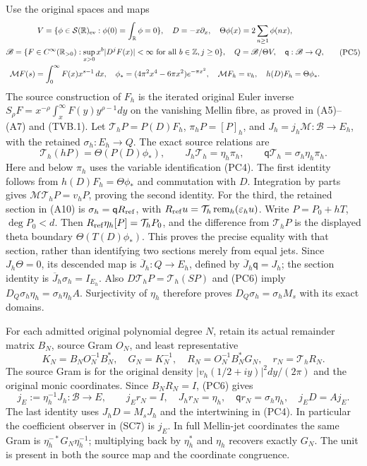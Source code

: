 Use the original spaces and maps
\[
\begin{gathered}
 V=\{\phi\in\mathcal S(\mathbb R)_{\rm ev}:
             \phi(0)=\int_{\mathbb R}\phi=0\},\quad
 D=-x\partial_x,\quad\Theta\phi(x)=2\sum_{n\ge1}\phi(nx),\\
 \mathscr B=\{F\in C^\infty(\mathbb R_{>0}):\sup_{x>0}x^b|D^jF(x)|<\infty
                  \text{ for all }b\in\mathbb Z,j\ge0\},\quad
 Q=\mathscr B/\Theta V,\quad\mathsf q:\mathscr B\to Q,\\
 \mathcal MF(s)=\int_0^\infty F(x)x^{s-1}\,dx,\quad
 \phi_*=(4\pi^2x^4-6\pi x^2)e^{-\pi x^2},\quad
 \mathcal M F_h=v_h,\quad h(D)F_h=\Theta\phi_*.
\end{gathered}\tag{PC5}
\]
The source construction of $F_h$ is the iterated original Euler inverse
$S_\rho F=x^{-\rho}\int_x^\infty F(y)y^{\rho-1}dy$ on the
vanishing Mellin fibre, as proved in (A5)--(A7) and (TVB.1).
Let $\mathcal T_hP=P(D)F_h$, $\pi_hP=[P]_h$, and
$J_h=j_h\mathcal M:\mathscr B\to E_h$, with the retained
$\sigma_h:E_h\to Q$.  The exact source relations are
\[
 \mathcal T_h(hP)=\Theta(P(D)\phi_*),\qquad
 J_h\mathcal T_h=\eta_h\pi_h,\qquad
 \mathsf q\mathcal T_h=\sigma_h\eta_h\pi_h.
 \tag{PC6}
\]
Here and below $\pi_h$ uses the variable identification (PC4).
The first identity follows from $h(D)F_h=\Theta\phi_*$ and
commutation with $D$.  Integration by parts gives
$\mathcal M\mathcal T_hP=v_hP$, proving the second identity.
For the third, the retained section in (A10) is
$\sigma_h=\mathsf q R_{\rm ref}$, with
$R_{\rm ref}u=\mathcal T_h\operatorname{rem}_h(\varepsilon_hu)$.
Write $P=P_0+hT$, $\deg P_0<d$.  Then
$R_{\rm ref}\eta_h[P]=\mathcal T_hP_0$, and the difference from
$\mathcal T_hP$ is the displayed theta boundary
$\Theta(T(D)\phi_*)$.  This proves the precise equality with that
section, rather than identifying two sections merely from equal jets.
Since $J_h\Theta=0$, its descended map is
$\overline J_h:Q\to E_h$, defined by
$\overline J_h\mathsf q=J_h$; the section identity is
$\overline J_h\sigma_h=I_{E_h}$.
Also $D\mathcal T_hP=\mathcal T_h(SP)$ and (PC6) imply
$D_Q\sigma_h\eta_h=\sigma_h\eta_hA$.
Surjectivity of $\eta_h$ therefore proves
$D_Q\sigma_h=\sigma_hM_s$ with its exact domains.

For each admitted original polynomial degree $N$, retain its actual
remainder matrix $B_N$, source Gram $O_N$, and least representative
\[
 K_N=B_NO_N^{-1}B_N^*,\quad G_N=K_N^{-1},\quad
 R_N=O_N^{-1}B_N^*G_N,\quad r_N=\mathcal T_hR_N.
 \tag{PC7}
\]
The source Gram is for the original density
$|v_h(1/2+iy)|^2dy/(2\pi)$ and the original monic coordinates.
Since $B_NR_N=I$, (PC6) gives
\[
 j_E:=\eta_h^{-1}J_h:\mathscr B\to E,\qquad
 j_Er_N=I,\quad J_hr_N=\eta_h,\quad
 \mathsf q r_N=\sigma_h\eta_h,\quad j_ED=Aj_E.
 \tag{PC8}
\]
The last identity uses $J_hD=M_sJ_h$ and the intertwining in
(PC4).  In particular the coefficient observer in (SC7) is $j_E$.
In full Mellin-jet coordinates the same Gram is
$\eta_h^{-*}G_N\eta_h^{-1}$; multiplying back by $\eta_h^*$
and $\eta_h$ recovers exactly $G_N$.  The unit is present in both
the source map and the coordinate congruence.

